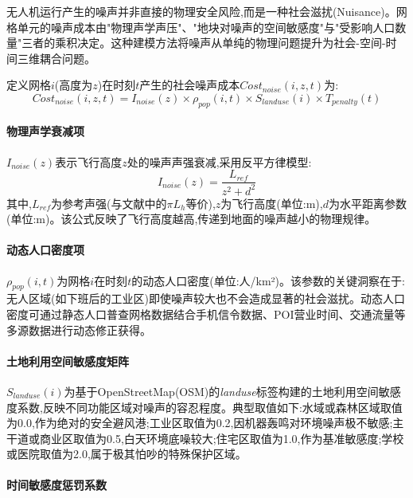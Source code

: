 无人机运行产生的噪声并非直接的物理安全风险,而是一种社会滋扰(Nuisance)。网格单元的噪声成本由"物理声学声压"、"地块对噪声的空间敏感度"与"受影响人口数量"三者的乘积决定。这种建模方法将噪声从单纯的物理问题提升为社会-空间-时间三维耦合问题。

定义网格$i$(高度为$z$)在时刻$t$产生的社会噪声成本$Cost_{noise}(i, z, t)$为:
\begin{equation}
Cost_{noise}(i, z, t) = I_{noise}(z) \times \rho_{pop}(i, t) \times S_{landuse}(i) \times T_{penalty}(t)
\label{eq:noise_cost}
\end{equation}

\paragraph{物理声学衰减项}

$I_{noise}(z)$表示飞行高度$z$处的噪声声强衰减,采用反平方律模型:
\begin{equation}
I_{noise}(z) = \frac{L_{ref}}{z^2 + d^2}
\label{eq:noise_intensity}
\end{equation}
其中,$L_{ref}$为参考声强(与文献中的$\pi L_h$等价),$z$为飞行高度(单位:m),$d$为水平距离参数(单位:m)。该公式反映了飞行高度越高,传递到地面的噪声越小的物理规律。

\paragraph{动态人口密度项}

$\rho_{pop}(i, t)$为网格$i$在时刻$t$的动态人口密度(单位:人/km²)。该参数的关键洞察在于:无人区域(如下班后的工业区)即使噪声较大也不会造成显著的社会滋扰。动态人口密度可通过静态人口普查网格数据结合手机信令数据、POI营业时间、交通流量等多源数据进行动态修正获得。

\paragraph{土地利用空间敏感度矩阵}

$S_{landuse}(i)$为基于OpenStreetMap(OSM)的\textit{landuse}标签构建的土地利用空间敏感度系数,反映不同功能区域对噪声的容忍程度。典型取值如下:水域或森林区域取值为0.0,作为绝对的安全避风港;工业区取值为0.2,因机器轰鸣对环境噪声极不敏感;主干道或商业区取值为0.5,白天环境底噪较大;住宅区取值为1.0,作为基准敏感度;学校或医院取值为2.0,属于极其怕吵的特殊保护区域。

\paragraph{时间敏感度惩罚系数}

